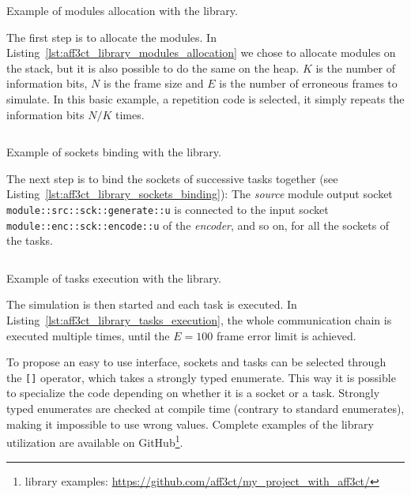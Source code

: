\begin{listing}[htp]
  \inputminted[frame=lines,linenos]{C++}{main/chapter4/src/use_cases/library/modules_allocation.cpp}
  \caption{Example of modules allocation with the \AFFECT library.}
  \label{lst:aff3ct_library_modules_allocation}
\end{listing}

The first step is to allocate the modules. In
Listing~\ref{lst:aff3ct_library_modules_allocation} we chose to allocate modules
on the stack, but it is also possible to do the same on the heap. $K$ is the
number of information bits, $N$ is the frame size and $E$ is the number of
erroneous frames to simulate. In this basic example, a repetition code is
selected, it simply repeats the information bits $N/K$ times.

\begin{listing}[htp]
  \inputminted[frame=lines,linenos]{C++}{main/chapter4/src/use_cases/library/sockets_binding.cpp}
  \caption{Example of sockets binding with the \AFFECT library.}
  \label{lst:aff3ct_library_sockets_binding}
\end{listing}

The next step is to bind the sockets of successive tasks together (see
Listing~\ref{lst:aff3ct_library_sockets_binding}): The \textit{source} module
output socket \verb|module::src::sck::generate::u| is connected to the input
socket \verb|module::enc::sck::encode::u| of the \textit{encoder}, and so
on, for all the sockets of the tasks.

\begin{listing}[htp]
  \inputminted[frame=lines,linenos]{C++}{main/chapter4/src/use_cases/library/tasks_execution.cpp}
  \caption{Example of tasks execution with the \AFFECT library.}
  \label{lst:aff3ct_library_tasks_execution}
\end{listing}

The simulation is then started and each task is executed. In
Listing~\ref{lst:aff3ct_library_tasks_execution}, the whole communication chain
is executed multiple times, until the $E = 100$ frame error limit is achieved.

To propose an easy to use interface, sockets and tasks can be selected through
the \verb|[]| operator, which takes a \Cxx strongly typed enumerate. This way it
is possible to specialize the code depending on whether it is a socket or a
task. Strongly typed enumerates are checked at compile time (contrary to
standard enumerates), making it impossible to use wrong values. Complete
examples of the \AFFECT library utilization are available on
GitHub\footnote{\AFFECT library examples: \url{https://github.com/aff3ct/my_project_with_aff3ct/}}.

